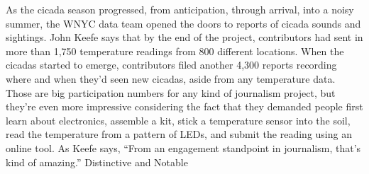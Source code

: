 As the cicada season progressed, from anticipation, through arrival, into a
noisy summer, the WNYC data team opened the doors to reports of cicada
sounds and sightings. John Keefe says that by the end of the project, contributors
had sent in more than 1,750 temperature readings from 800 different
locations. When the cicadas started to emerge, contributors filed another
4,300 reports recording where and when they'd seen new cicadas, aside
from any temperature data. Those are big participation numbers for any
kind of journalism project, but they're even more impressive considering
the fact that they demanded people first learn about electronics, assemble
a kit, stick a temperature sensor into the soil, read the temperature from a
pattern of LEDs, and submit the reading using an online tool. As Keefe says,
``From an engagement standpoint in journalism, that's kind of amazing.''
Distinctive and Notable

